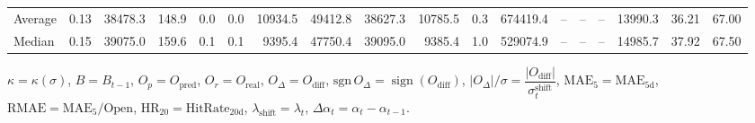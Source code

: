 \begin{threeparttable}
{\begin{tabular}{lrrrrrrrrrrrrrrrrr}
Average &     0.13 & 38478.3 &             148.9 &               0.0 &                0.0 &            10934.5 & 49412.8 & 38627.3 &    10785.5 &                      0.3 &            674419.4 &         -- &        -- &             -- &          13990.3 &           36.21 &                  67.00 \\
 Median &     0.15 & 39075.0 &             159.6 &               0.1 &                0.1 &             9395.4 & 47750.4 & 39095.0 &     9385.4 &                      1.0 &            529074.9 &         -- &        -- &             -- &          14985.7 &           37.92 &                  67.50 \\
\bottomrule
\end{tabular}
}
\begin{tablenotes}\footnotesize
\item $\kappa=\kappa(\sigma)$, $B=B_{t-1}$, $O_p=O_{\text{pred}}$, $O_r=O_{\text{real}}$, $O_\Delta=O_{\text{diff}}$, $\mathrm{sgn}\,O_\Delta=\operatorname{sign}(O_{\text{diff}})$, $|O_\Delta|/\sigma=\dfrac{|O_{\text{diff}}|}{\sigma_t^{\text{shift}}}$, $\mathrm{MAE}_5=\mathrm{MAE}_{5\text{d}}$, $\mathrm{RMAE}= \mathrm{MAE}_5 / \text{Open}$, $\mathrm{HR}_{20}=\mathrm{HitRate}_{20\text{d}}$, 
$\lambda_{\text{shift}}=\lambda_t$, 
$\Delta\alpha_t=\alpha_t-\alpha_{t-1}$.
\end{tablenotes}
\end{threeparttable}
\endgroup

